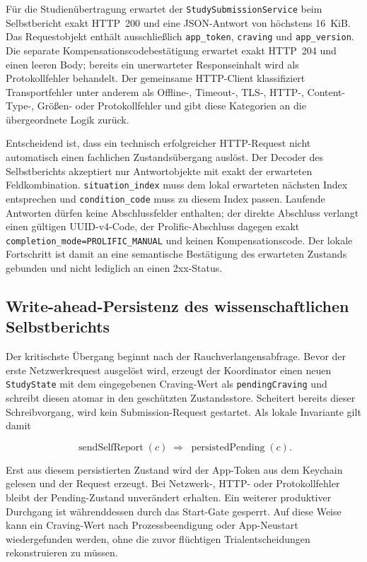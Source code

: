 \begin{neu}
Für die Studienübertragung erwartet der \texttt{StudySubmissionService} beim Selbstbericht exakt HTTP~200 und eine JSON-Antwort von höchstens 16~KiB. Das Requestobjekt enthält ausschließlich \texttt{app\_token}, \texttt{craving} und \texttt{app\_version}. Die separate Kompensationscodebestätigung erwartet exakt HTTP~204 und einen leeren Body; bereits ein unerwarteter Responseinhalt wird als Protokollfehler behandelt. Der gemeinsame HTTP-Client klassifiziert Transportfehler unter anderem als Offline-, Timeout-, TLS-, HTTP-, Content-Type-, Größen- oder Protokollfehler und gibt diese Kategorien an die übergeordnete Logik zurück.

Entscheidend ist, dass ein technisch erfolgreicher HTTP-Request nicht automatisch einen fachlichen Zustandsübergang auslöst. Der Decoder des Selbstberichts akzeptiert nur Antwortobjekte mit exakt der erwarteten Feldkombination. \texttt{situation\_index} muss dem lokal erwarteten nächsten Index entsprechen und \texttt{condition\_code} muss zu diesem Index passen. Laufende Antworten dürfen keine Abschlussfelder enthalten; der direkte Abschluss verlangt einen gültigen UUID-v4-Code, der Prolific-Abschluss dagegen exakt \texttt{completion\_mode=PROLIFIC\_MANUAL} und keinen Kompensationscode. Der lokale Fortschritt ist damit an eine semantische Bestätigung des erwarteten Zustands gebunden und nicht lediglich an einen 2xx-Status.

\subsection{Write-ahead-Persistenz des wissenschaftlichen Selbstberichts}

Der kritischste Übergang beginnt nach der Rauchverlangensabfrage. Bevor der erste Netzwerkrequest ausgelöst wird, erzeugt der Koordinator einen neuen \texttt{StudyState} mit dem eingegebenen Craving-Wert als \texttt{pendingCraving} und schreibt diesen atomar in den geschützten Zustandsstore. Scheitert bereits dieser Schreibvorgang, wird kein Submission-Request gestartet. Als lokale Invariante gilt damit

\[
\operatorname{sendSelfReport}(c)
\;\Rightarrow\;
\operatorname{persistedPending}(c).
\]

Erst aus diesem persistierten Zustand wird der App-Token aus dem Keychain gelesen und der Request erzeugt. Bei Netzwerk-, HTTP- oder Protokollfehler bleibt der Pending-Zustand unverändert erhalten. Ein weiterer produktiver Durchgang ist währenddessen durch das Start-Gate gesperrt. Auf diese Weise kann ein Craving-Wert nach Prozessbeendigung oder App-Neustart wiedergefunden werden, ohne die zuvor flüchtigen Trialentscheidungen rekonstruieren zu müssen.


\end{neu}

